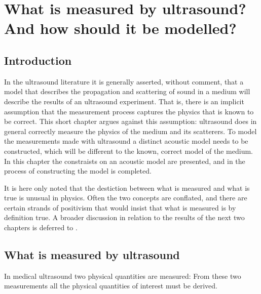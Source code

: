 

\chapter{What is measured by ultrasound?\\And how should it be modelled?}\label{ch:observables}



\section{Introduction}
In the ultrasound literature it is generally asserted, without comment,
that a model that describes the propagation and scattering of sound in a medium will describe the results of an ultrasound experiment.
That is, there is an implicit assumption that the measurement process captures the physics that is known to be correct.
This short chapter argues against this assumption:
ultrasound does in general correctly measure the physics of the medium and its scatterers.
To model the measurements made with ultrasound a distinct acoustic model needs to be constructed,
which will be different to the known, correct model of the medium.
In this chapter the constraists on an acoustic model are presented,
and in  the process of constructing the model is completed.

It is here only noted that the destiction between what is measured and what is true is unusual in physics.
Often the two concepts are conflated,
and there are certain strands of positivism that would insist that what is measured is by definition true.
A broader discussion in relation to the results of the next two chapters is deferred to .


\section{What is measured by ultrasound}\label{sec:measurement}


In medical ultrasound two physical quantities are measured:
From these two measurements all the physical quantities of interest must be derived.

